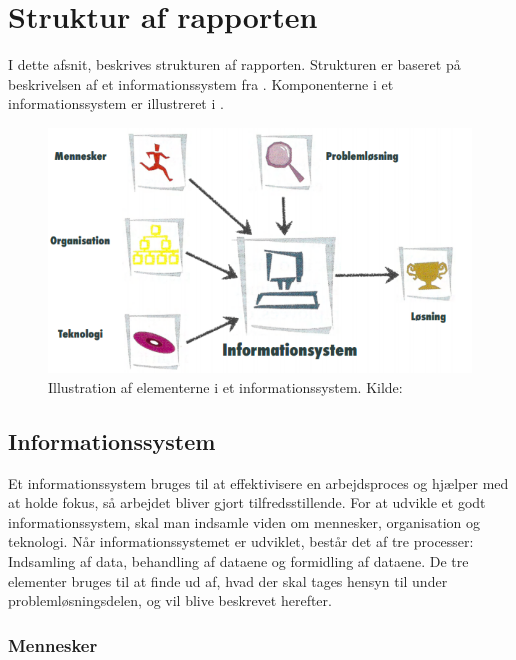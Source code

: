 \chapter{Struktur af rapporten}\label{chap:struktur-af-problemanalyse}

I dette afsnit, beskrives strukturen af rapporten.
Strukturen er baseret på beskrivelsen af et informationssystem fra \citet{Laudon1999}.
Komponenterne i et informationssystem er illustreret i .

\begin{figure}[htbp]
  \centering
  \includegraphics{images/kontekstmodel/metode.png}
  \caption[Metode for Kontekstmodellen]{Illustration af elementerne i et informationssystem. Kilde:
  \protect\citet{Laudon1999}}
  \label{fig:kontekstmodel}
\end{figure}


\section{Informationssystem}\label{sec:Informationssystem}

Et informationssystem bruges til at effektivisere en arbejdsproces og hjælper med at holde fokus, så arbejdet bliver gjort tilfredsstillende. 
For at udvikle et godt informationssystem, skal man indsamle viden om mennesker, organisation og teknologi. 
Når informationssystemet er udviklet, består det af tre processer: Indsamling af data, behandling af dataene og formidling af dataene. 
De tre elementer bruges til at finde ud af, hvad der skal tages hensyn til under problemløsningsdelen, og vil blive beskrevet herefter.


\subsection{Mennesker}\label{subsec:mennesker}

